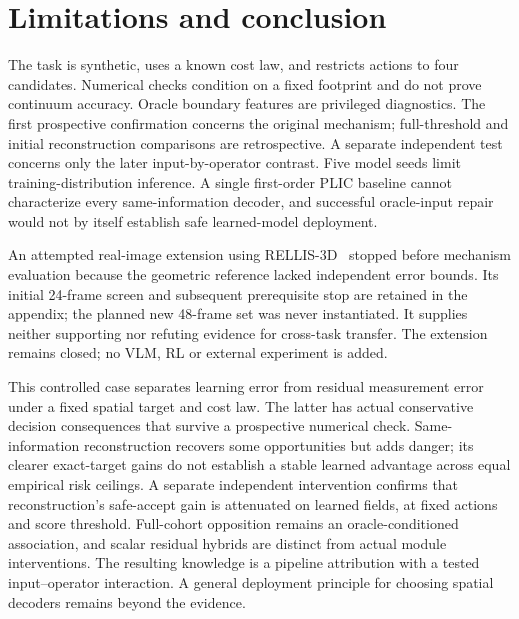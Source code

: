\section{Limitations and conclusion}
\label{sec:limitations}
The task is synthetic, uses a known cost law, and restricts actions to four
candidates. Numerical checks condition on a fixed footprint and do not prove
continuum accuracy. Oracle boundary features are privileged diagnostics. The
first prospective confirmation concerns the original mechanism; full-threshold
and initial reconstruction comparisons are retrospective. A separate independent
test concerns only the later input-by-operator contrast. Five model seeds limit
training-distribution inference. A single first-order PLIC baseline cannot
characterize every same-information decoder, and successful oracle-input repair
would not by itself establish safe learned-model deployment.

An attempted real-image extension using RELLIS-3D~\citep{rellis} stopped before
mechanism evaluation because the geometric reference lacked independent error
bounds. Its initial 24-frame screen and subsequent prerequisite stop are retained
in the appendix; the planned new 48-frame set was never instantiated. It supplies
neither supporting nor refuting evidence for cross-task transfer. The extension
remains closed; no VLM, RL or external experiment is added.

This controlled case separates learning error from residual measurement error
under a fixed spatial target and cost law. The latter has actual conservative
decision consequences that survive a prospective numerical check. Same-information
reconstruction recovers some opportunities but adds danger; its clearer exact-target
gains do not establish a stable learned advantage across equal empirical risk
ceilings. A separate independent intervention confirms that reconstruction's
safe-accept gain is attenuated on learned fields, at fixed actions and score
threshold. Full-cohort opposition remains an oracle-conditioned association,
and scalar residual hybrids are distinct from actual module interventions.
The resulting knowledge is a pipeline attribution with a tested input--operator
interaction. A general deployment principle for choosing spatial decoders
remains beyond the evidence.
